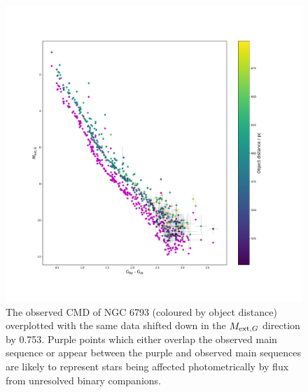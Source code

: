 \documentclass[12pt, a4paper]{report}
\begin{document}
\begin{figure}[h!]
\begin{center}
\includegraphics[width=1.0\textwidth]{../NGC_6793_CMD_Myr_binary_check_plx_selected_vizier.pdf}
\caption{The observed CMD of NGC 6793 (coloured by object distance) overplotted with the same data shifted down in the $M_{\textnormal{ext},G}$ direction by 0.753. Purple points which either overlap the observed main sequence or appear between the purple and observed main sequences are likely to represent stars being affected photometrically by flux from unresolved binary companions.}
\label{NGC_6793_binary}
\end{center}
\end{figure}
\end{document}
